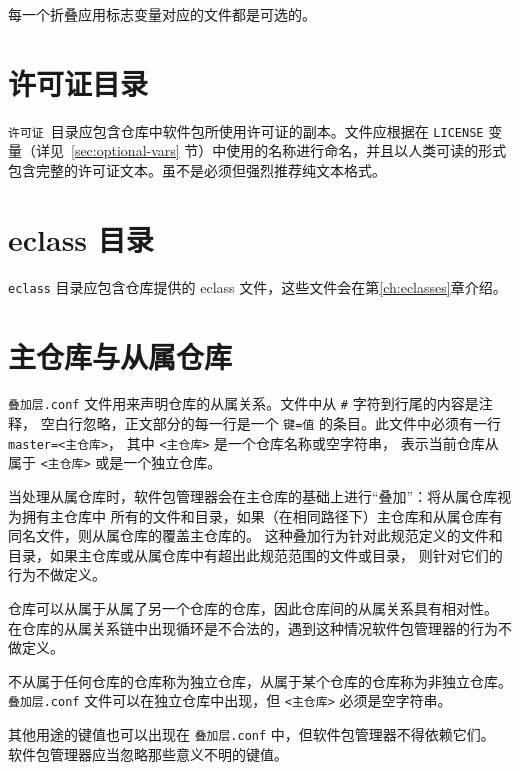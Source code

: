 每一个折叠应用标志变量对应的文件都是可选的。

\section{许可证目录}
\label{sec:licenses-dir}

\texttt{许可证}\ 目录应包含仓库中软件包所使用许可证的副本。文件应根据在 \texttt{LICENSE}
变量（详见~\ref{sec:optional-vars} 节）中使用的名称进行命名，并且以人类可读的形式
包含完整的许可证文本。虽不是必须但强烈推荐纯文本格式。

\section{eclass 目录}
\label{sec:eclass-dir}

\texttt{eclass} 目录应包含仓库提供的 eclass 文件，这些文件会在第\ref{ch:eclasses}章介绍。

\section{主仓库与从属仓库}
\label{sec:overlay}

\texttt{叠加层.conf} 文件用来声明仓库的从属关系。文件中从 \texttt{\#} 字符到行尾的内容是注释，
空白行忽略，正文部分的每一行是一个 \verb|键=值| 的条目。此文件中必须有一行 \verb|master=<主仓库>|，
其中 \texttt{<\hspace{0em}主仓库\hspace{0em}>} 是一个仓库名称或空字符串，
表示当前仓库从属于 \texttt{<\hspace{0em}主仓库\hspace{0em}>} 或是一个独立仓库。

当处理从属仓库时，软件包管理器会在主仓库的基础上进行“叠加”：将从属仓库视为拥有主仓库中
所有的文件和目录，如果（在相同路径下）主仓库和从属仓库有同名文件，则从属仓库的覆盖主仓库的。
这种叠加行为针对此规范定义的文件和目录，如果主仓库或从属仓库中有超出此规范范围的文件或目录，
则针对它们的行为不做定义。

仓库可以从属于从属了另一个仓库的仓库，因此仓库间的从属关系具有相对性。
在仓库的从属关系链中出现循环是不合法的，遇到这种情况软件包管理器的行为不做定义。

不从属于任何仓库的仓库称为独立仓库，从属于某个仓库的仓库称为非独立仓库。\texttt{叠加层.conf}
文件可以在独立仓库中出现，但 \texttt{<\hspace{0em}主仓库\hspace{0em}>} 必须是空字符串。

其他用途的键值也可以出现在 \texttt{叠加层.conf} 中，但软件包管理器不得依赖它们。
软件包管理器应当忽略那些意义不明的键值。


